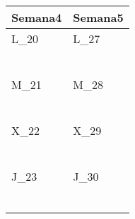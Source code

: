 	\renewcommand{\arraystretch}{1.25}\scriptsize
	\begin{longtabu} to \textwidth { X[l] X[l]}
		\centering \textbf{Semana4} &  \centering\textbf{Semana5}  \\
		\toprule
		L_{20} & L_{27} \\
		\makebox{$\square$}\dotfill & \makebox{$\square$}\dotfill \\
		\dotfill & \dotfill \\
		\makebox{$\square$}\dotfill & \makebox{$\square$}\dotfill \\
		\dotfill & \dotfill \\
		\makebox{$\square$}\dotfill & \makebox{$\square$}\dotfill \\
		\dotfill & \dotfill \\

		\hline

		M_{21} & M_{28} \\
		\makebox{$\square$}\dotfill & \makebox{$\square$}\dotfill \\
		\dotfill & \dotfill \\
		\makebox{$\square$}\dotfill & \makebox{$\square$}\dotfill \\
		\dotfill & \dotfill \\
		\makebox{$\square$}\dotfill & \makebox{$\square$}\dotfill \\
		\dotfill & \dotfill \\

		\hline

		X_{22} & X_{29} \\
		\makebox{$\square$}\dotfill & \makebox{$\square$}\dotfill \\
		\dotfill & \dotfill \\
		\makebox{$\square$}\dotfill & \makebox{$\square$}\dotfill \\
		\dotfill & \dotfill \\
		\makebox{$\square$}\dotfill & \makebox{$\square$}\dotfill \\
		\dotfill & \dotfill \\

		\hline

		J_{23} & J_{30} \\
		\makebox{$\square$}\dotfill & \makebox{$\square$}\dotfill \\
		\dotfill & \dotfill \\
		\makebox{$\square$}\dotfill & \makebox{$\square$}\dotfill \\
		\dotfill & \dotfill \\
		\makebox{$\square$}\dotfill & \makebox{$\square$}\dotfill \\
		\dotfill & \dotfill \\


\end{longtabu}
